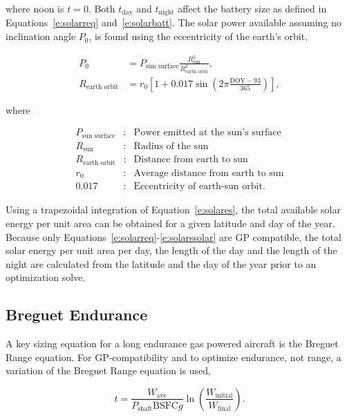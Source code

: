     where noon is $t=0$. Both $t_{\text{day}}$ and $t_{\text{night}}$ affect the battery size as defined in Equations~\eqref{e:solarreq} and~\eqref{e:solarbatt}. The solar power available assuming no inclination angle $P_0$, is found using the eccentricity of the earth's orbit, 

    \begin{align}
        \label{e:solarp0}
        P_0 & = P_{\text{sun surface}} \frac{R_{\text{sun}}^2}{R_{\text{earth orbit}}^2}, \\
        \label{e:solareo}
        R_{\text{earth orbit}} & = r_0 \left[ 1 + 0.017 \sin{\left( 2\pi \frac{\text{DOY}-93}{365}\right)} \right],
    \end{align}
    
    where 

    \[ \begin{array}{lcl}
        P_{\text{sun surface}} & : & \text{Power emitted at the sun's surface} \\
        R_{\text{sun}} & : & \text{Radius of the sun} \\
        R_{\text{earth orbit}} & : & \text{Distance from earth to sun} \\
        r_0 & : & \text{Average distance from earth to sun} \\
        0.017 & : & \text{Eccentricity of earth-sun orbit}.
    \end{array} \]

    Using a trapezoidal integration of Equation~\eqref{e:solares}, the total available solar energy per unit area can be obtained for a given latitude and day of the year. Because only Equations~\eqref{e:solarreq}-\eqref{e:solarssolar} are GP compatible, the total solar energy per unit area per day, the length of the day and the length of the night are calculated from the latitude and the day of the year prior to an optimization solve.

\subsection{Breguet Endurance}

A key sizing equation for a long endurance gas powered aircraft is the Breguet Range equation.  
For GP-compatibility and to optimize endurance, not range, a variation of the Breguet Range equation is used, 

\begin{equation}
    \label{e:breguetendurance}
    t = \frac{W_{\text{ave}}}{P_{\text{shaft}}\text{BSFC}g} \ln{\left( \frac{W_{\text{initial}}}{W_{\text{final}}}\right)}.
\end{equation}

